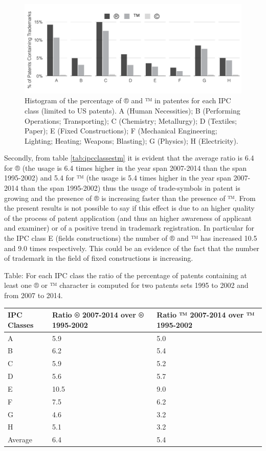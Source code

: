 \documentclass[]{book}
\begin{document}
\begin{figure}

{\centering \includegraphics[width=0.8\linewidth]{_bookdown_files/figures/hist_tm} 

}

\caption{Histogram of the percentage of ® and ™ in patentes for each IPC class (limited to US patents). A (Human Necessities); B (Performing Operations; Transporting); C (Chemistry; Metallurgy); D (Textiles; Paper); E (Fixed Constructions); F (Mechanical Engineering; Lighting; Heating; Weapons; Blasting); G (Physics); H (Electricity).}\label{fig:histtm}
\end{figure}

Secondly, from table \ref{tab:ipcclassestm} it is evident that the
average ratio is 6.4 for ® (the usage is 6.4 times higher in the year
span 2007-2014 than the span 1995-2002) and 5.4 for ™ (the usage is 5.4
times higher in the year span 2007-2014 than the span 1995-2002) thus
the usage of trade-symbols in patent is growing and the presence of ® is
increasing faster than the presence of ™. From the present results is
not possible to say if this effect is due to an higher quality of the
process of patent application (and thus an higher awareness of applicant
and examiner) or of a positive trend in trademark registration. In
particular for the IPC class E (fields constructions) the number of ®
and ™ has increased 10.5 and 9.0 times respectively. This could be an
evidence of the fact that the number of trademark in the field of fixed
constructions is increasing.

Table: \label{tab:ipcclassestm} For each IPC class the ratio of the
percentage of patents containing at least one ® or ™ character is
computed for two patents sets 1995 to 2002 and from 2007 to 2014.

\begin{tabular}{l|l|l}
\hline
IPC Classes & Ratio ® 2007-2014 over ® 1995-2002   & Ratio ™ 2007-2014 over ™ 1995-2002  \\
\hline
A & 5.9 & 5.0\\
\hline
B & 6.2 & 5.4\\
\hline
C & 5.9 & 5.2\\
\hline
D & 5.6 & 5.7\\
\hline
E & 10.5 & 9.0\\
\hline
F & 7.5 & 6.2\\
\hline
G & 4.6 & 3.2\\
\hline
H & 5.1 & 3.2\\
\hline
Average & 6.4 & 5.4\\
\hline
\end{tabular}
\end{document}
